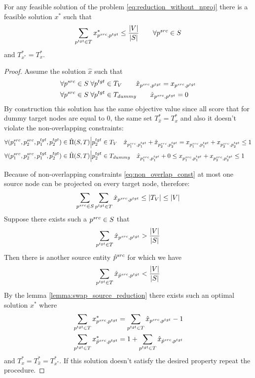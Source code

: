 \begin{corollary} \label{col:bound_num_proj_reduction}
  For any feasible solution of the problem \eqref{eq:reduction_without_nproj} there is a feasible solution  \( x^* \)
  such that
  \[
    \sum\limits_{p^{tgt} \in T} x^*_{p^{src}, p^{tgt}} \leq \frac{|V|}{|S|}
    \qquad \forall p^{src} \in S
  \]
  and \( T_{x^*}^* =  T^*_x \).
\end{corollary}
\begin{proof}
  Assume the solution \( \hat{x} \) such that
  \begin{align*}
    & \forall p^{src} \in S \; \forall p^{tgt} \in T_V \qquad \hat{x}_{p^{src}, p^{tgt}} = x_{p^{src}, p^{tgt}} \\
    & \forall p^{src} \in S \; \forall p^{tgt} \in T_{dummy} \qquad \hat{x}_{p^{src}, p^{tgt}} = 0
  \end{align*}
  By construction this solution has the same objective value since all score that for dummy target nodes are equal to \( 0 \),
  the same set \( T^*_{\hat{x}} = T^*_x \)
  and also it doesn't violate the non-overlapping constraints:
  \begin{align*}
    & \forall (p_1^{src}, p_2^{src}, p_1^{tgt}, p_2^{tgt}) \in \hat{\Pi}(S, T) \Big| p_2^{tgt} \in T_{V} \quad
    \hat{x}_{p_1^{src}, p_1^{tgt}} + \hat{x}_{p_2^{src}, p_2^{tgt}} =
    x_{p_1^{src}, p_1^{tgt}} + x_{p_2^{src}, p_2^{tgt}} \leq 1                                                      \\
    & \forall (p_1^{src}, p_2^{src}, p_1^{tgt}, p_2^{tgt}) \in \hat{\Pi}(S, T) \Big| p_2^{tgt} \in T_{dummy} \quad
    \hat{x}_{p_1^{src}, p_1^{tgt}} + 0 \leq
    x_{p_1^{src}, p_1^{tgt}} + x_{p_2^{src}, p_2^{tgt}} \leq 1
  \end{align*}

  Because of non-overlapping constraints \eqref{eq:non_overlap_const} at most one source node can
  be projected on every target node, therefore:
  \[
    \sum\limits_{p^{src} \in S} \sum\limits_{p^{tgt} \in T} \hat{x}_{p^{src}, p^{tgt}} \leq |T_V| \leq |V|
  \]
  Suppose there exists such a \( p^{src} \in S \) that
  \[
    \sum\limits_{p^{tgt} \in T} \hat{x}_{p^{src}, p^{tgt}} > \frac{|V|}{|S|}
  \]
  Then there is another source entity \( \hat{p}^{src} \) for which we have
  \[
    \sum\limits_{p^{tgt} \in T} \hat{x}_{\hat{p}^{src}, p^{tgt}} < \frac{|V|}{|S|}
  \]
  By the lemma \ref{lemma:swap_source_reduction} there exists such an optimal solution \( x^* \)
  where
  \begin{align*}
    & \sum\limits_{p^{tgt} \in T} x^*_{p^{src}, p^{tgt}} = \sum\limits_{p^{tgt} \in T} \hat{x}_{p^{src}, p^{tgt}} - 1             \\
    & \sum\limits_{p^{tgt} \in T} x^*_{\hat{p}^{src}, p^{tgt}} = 1 + \sum\limits_{p^{tgt} \in T} \hat{x}_{\hat{p}^{src}, p^{tgt}} \\
  \end{align*}
  and \( T^*_x = T^*_{\hat{x}} = T^*_{x^*}  \). If this solution doesn't satisfy the desired property repeat the procedure.
\end{proof}

